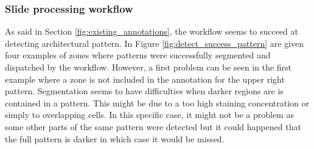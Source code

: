 \subsubsection{Slide processing workflow}
\label{ssec:detect_slide_processing}
As said in Section \ref{fig:existing_annotations}, the workflow seems to succeed at detecting architectural pattern. In Figure \ref{fig:detect_success_pattern} are given four examples of zones where patterns were successfully segmented and dispatched by the workflow. However, a first problem can be seen in the first example where a zone is not included in the annotation for the upper right pattern. Segmentation seems to have difficulties when darker regions are is contained in a pattern. This might be due to a too high staining concentration or simply to overlapping cells. In this specific case, it might not be a problem as some other parts of the same pattern were detected but it could happened that the full pattern is darker in which case it would be missed. 

